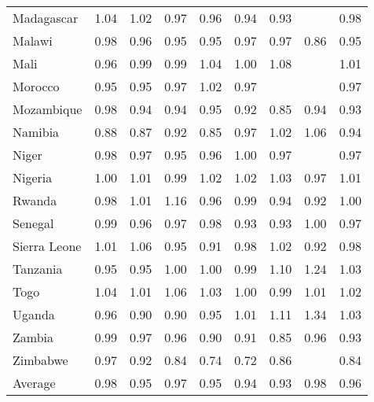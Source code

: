 \documentclass[12pt]{article}\usepackage[]{graphicx}\usepackage[]{color}
\begin{document}
\begin{table}[htbp]
\begin{tabular}{lrrrrrrrr}
  Madagascar & 1.04 & 1.02 & 0.97 & 0.96 & 0.94 & 0.93 &  & 0.98 \\ 
  Malawi & 0.98 & 0.96 & 0.95 & 0.95 & 0.97 & 0.97 & 0.86 & 0.95 \\ 
  Mali & 0.96 & 0.99 & 0.99 & 1.04 & 1.00 & 1.08 &  & 1.01 \\ 
  Morocco & 0.95 & 0.95 & 0.97 & 1.02 & 0.97 &  &  & 0.97 \\ 
  Mozambique & 0.98 & 0.94 & 0.94 & 0.95 & 0.92 & 0.85 & 0.94 & 0.93 \\ 
  Namibia & 0.88 & 0.87 & 0.92 & 0.85 & 0.97 & 1.02 & 1.06 & 0.94 \\ 
  Niger & 0.98 & 0.97 & 0.95 & 0.96 & 1.00 & 0.97 &  & 0.97 \\ 
  Nigeria & 1.00 & 1.01 & 0.99 & 1.02 & 1.02 & 1.03 & 0.97 & 1.01 \\ 
  Rwanda & 0.98 & 1.01 & 1.16 & 0.96 & 0.99 & 0.94 & 0.92 & 1.00 \\ 
  Senegal & 0.99 & 0.96 & 0.97 & 0.98 & 0.93 & 0.93 & 1.00 & 0.97 \\ 
  Sierra Leone & 1.01 & 1.06 & 0.95 & 0.91 & 0.98 & 1.02 & 0.92 & 0.98 \\ 
  Tanzania & 0.95 & 0.95 & 1.00 & 1.00 & 0.99 & 1.10 & 1.24 & 1.03 \\ 
  Togo & 1.04 & 1.01 & 1.06 & 1.03 & 1.00 & 0.99 & 1.01 & 1.02 \\ 
  Uganda & 0.96 & 0.90 & 0.90 & 0.95 & 1.01 & 1.11 & 1.34 & 1.03 \\ 
  Zambia & 0.99 & 0.97 & 0.96 & 0.90 & 0.91 & 0.85 & 0.96 & 0.93 \\ 
  Zimbabwe & 0.97 & 0.92 & 0.84 & 0.74 & 0.72 & 0.86 &  & 0.84 \\ 
   \hline
  Average & 0.98 & 0.95 & 0.97 & 0.95 & 0.94 & 0.93 & 0.98 & 0.96 \\ 
   \bottomrule
\end{tabular}
\end{table}




\end{document}
